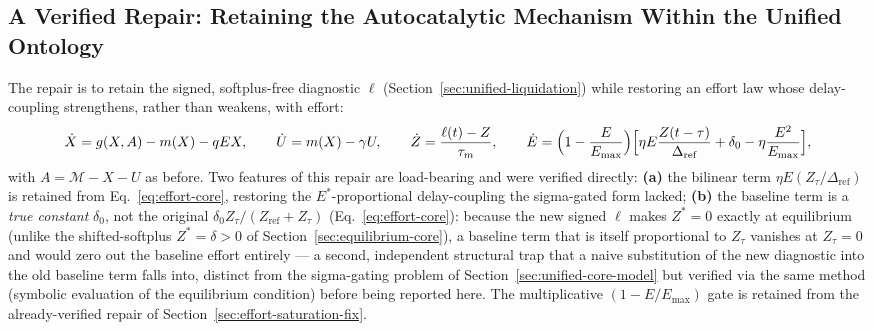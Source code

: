 \documentclass[twocolumn,10pt]{article}
\begin{document}
\subsection{A Verified Repair: Retaining the Autocatalytic Mechanism Within the Unified Ontology}
\label{sec:unified-core-fixed}
The repair is to retain the signed, softplus-free diagnostic $\ell$ (Section~\ref{sec:unified-liquidation}) while restoring an effort law whose delay-coupling strengthens, rather than weakens, with effort:
\begin{equation}
\dot X = g(X,A)-m(X)-qEX,\qquad
\dot U = m(X)-\gamma U,\qquad
\dot Z = \frac{\ell(t)-Z}{\tau_m},\qquad
\dot E = \Bigl(1-\frac{E}{E_{\max}}\Bigr)\Bigl[\eta E\frac{Z(t-\tau)}{\Delta_{\text{ref}}}+\delta_0-\eta\frac{E^2}{E_{\max}}\Bigr],
\label{eq:unified-core-v2}
\end{equation}
with $A=\mathcal M-X-U$ as before. Two features of this repair are load-bearing and were verified directly: \textbf{(a)} the bilinear term $\eta E(Z_\tau/\Delta_{\text{ref}})$ is retained from Eq.~\eqref{eq:effort-core}, restoring the $E^*$-proportional delay-coupling the sigma-gated form lacked; \textbf{(b)} the baseline term is a \emph{true constant} $\delta_0$, not the original $\delta_0 Z_\tau/(Z_{\text{ref}}+Z_\tau)$ (Eq.~\eqref{eq:effort-core}): because the new signed $\ell$ makes $Z^*=0$ exactly at equilibrium (unlike the shifted-softplus $Z^*=\delta>0$ of Section~\ref{sec:equilibrium-core}), a baseline term that is itself proportional to $Z_\tau$ vanishes at $Z_\tau=0$ and would zero out the baseline effort entirely --- a second, independent structural trap that a naive substitution of the new diagnostic into the old baseline term falls into, distinct from the sigma-gating problem of Section~\ref{sec:unified-core-model} but verified via the same method (symbolic evaluation of the equilibrium condition) before being reported here. The multiplicative $(1-E/E_{\max})$ gate is retained from the already-verified repair of Section~\ref{sec:effort-saturation-fix}.
\end{document}
